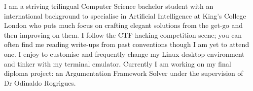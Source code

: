 

\begin{cvparagraph}

I am a striving trilingual Computer Science bachelor student with an international background to specialise in Artificial Intelligence at King’s College London who puts much focus on crafting elegant solutions from the get-go and then improving on them. I follow the CTF hacking competition scene; you can often find me reading write-ups from past conventions though I am yet to attend one. I enjoy to customise and frequently change my Linux desktop environment and tinker with my terminal emulator. Currently I am working on my final diploma project: an Argumentation Framework Solver under the supervision of Dr Odinaldo Rogrigues.
\end{cvparagraph}
